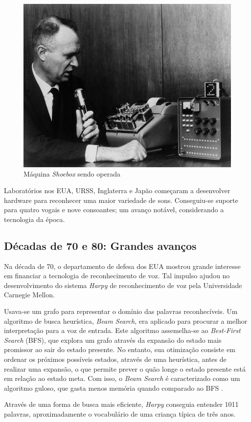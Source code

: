 \begin{figure}[H]
  \centering
  \includegraphics[width=.5\textwidth]{image/shoebox.jpg}
  \caption{Máquina \textit{Shoebox} sendo operada \citep{shoeboxImage}}
  \label{shoebox}
\end{figure}

Laboratórios nos EUA, URSS, Inglaterra e Japão começaram a desenvolver hardware para reconhecer uma maior variedade de sons. Conseguiu-se suporte para quatro vogais e nove consoantes; um avanço notável, considerando a tecnologia da época.


\subsection{Décadas de 70 e 80: Grandes avanços}

Na década de 70, o departamento de defesa dos EUA mostrou grande interesse em financiar a tecnologia de reconhecimento de voz. Tal impulso ajudou no desenvolvimento do sistema \emph{Harpy} de reconhecimento de voz pela Universidade Carnegie Mellon.

Usava-se um grafo para representar o domínio das palavras reconhecíveis. Um algoritmo de busca heurística, \emph{Beam Search}, era aplicado para procurar a melhor interpretação para a voz de entrada. Este algoritmo assemelha-se ao \textit{Best-First Search} (BFS), que explora um grafo através da expansão do estado mais promissor ao sair do estado presente. No entanto, sua otimização consiste em ordenar os próximos possíveis estados, através de uma heurística, antes de realizar uma expansão, o que permite prever o quão longe o estado presente está em relação ao estado meta. Com isso, o \textit{Beam Search} é caracterizado como um algoritmo guloso, que gasta menos memória quando comparado ao BFS \citep{beamSearch}.

Através de uma forma de busca mais eficiente, \textit{Harpy} conseguia entender 1011 palavras, aproximadamente o vocabulário de uma criança típica de três anos.

